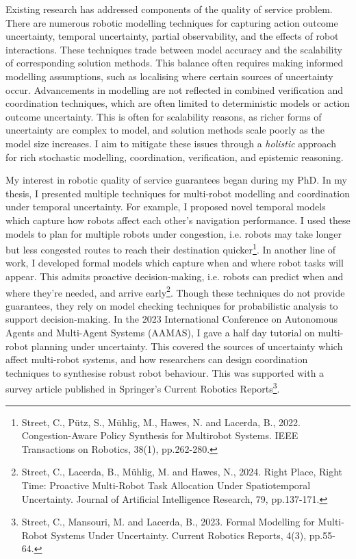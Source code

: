 \documentclass[12pt]{article}
\begin{document}
Existing research has addressed components of the quality of service problem.
%
There are numerous robotic modelling techniques for capturing action outcome uncertainty, temporal uncertainty, partial observability, and the effects of robot interactions.
%
These techniques trade between model accuracy and the scalability of corresponding solution methods.
%
This balance often requires making informed modelling assumptions, such as localising where certain sources of uncertainty occur.
%
Advancements in modelling are not reflected in combined verification and coordination techniques, which are often limited to deterministic models or action outcome uncertainty.
%
This is often for scalability reasons, as richer forms of uncertainty are complex to model, and solution methods scale poorly as the model size increases.
%
I aim to mitigate these issues through a \emph{holistic} approach for rich stochastic modelling, coordination, verification, and epistemic reasoning.


My interest in robotic quality of service guarantees began during my PhD.
%
In my thesis, I presented multiple techniques for multi-robot modelling and coordination under temporal uncertainty.
%
For example, I proposed novel temporal models which capture how robots affect each other's navigation performance.
%
I used these models to plan for multiple robots under congestion, i.e. robots may take longer but less congested routes to reach their destination quicker\footnote{Street, C., Pütz, S., Mühlig, M., Hawes, N. and Lacerda, B., 2022. Congestion-Aware Policy Synthesis for Multirobot Systems. IEEE Transactions on Robotics, 38(1), pp.262-280.}.
%
In another line of work, I developed formal models which capture when and where robot tasks will appear.
%
This admits proactive decision-making, i.e. robots can predict when and where they're needed, and arrive early\footnote{Street, C., Lacerda, B., Mühlig, M. and Hawes, N., 2024. Right Place, Right Time: Proactive Multi-Robot Task Allocation Under Spatiotemporal Uncertainty. Journal of Artificial Intelligence Research, 79, pp.137-171.}.
%
Though these techniques do not provide guarantees, they rely on model checking techniques for probabilistic analysis to support decision-making.
%
In the 2023 International Conference on Autonomous Agents and Multi-Agent Systems (AAMAS), I gave a half day tutorial on multi-robot planning under uncertainty.
%
This covered the sources of uncertainty which affect multi-robot systems, and how researchers can design coordination techniques to synthesise robust robot behaviour.
%
This was supported with a survey article published in Springer's Current Robotics Reports\footnote{Street, C., Mansouri, M. and Lacerda, B., 2023. Formal Modelling for Multi-Robot Systems Under Uncertainty. Current Robotics Reports, 4(3), pp.55-64.}.
\end{document}
